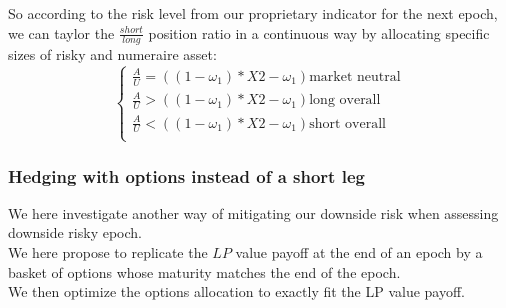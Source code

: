 \documentclass[conference]{IEEEtran}
\begin{document}
So according to the risk level from our proprietary indicator for the next epoch, we can taylor the $\frac{short}{long}$ position ratio in a continuous way by allocating specific sizes of risky and numeraire asset:\\
\begin{equation}
\left\{
\begin{array}{lll}
\frac{A}{U} = \left((1-\omega_1)*X2-\omega_1 \right)\text{market neutral} \\
\frac{A}{U} > \left((1-\omega_1)*X2-\omega_1 \right) \text{long overall} \\
\frac{A}{U} < \left((1-\omega_1)*X2-\omega_1 \right)\text{short overall}  \\
\end{array}
\end{equation}


\subsubsection{Hedging with options instead of a short leg}
We here investigate another way of mitigating our downside risk when assessing downside risky epoch.\\
We here propose to replicate the $LP$ value payoff at the end of an epoch by a basket of options whose maturity matches the end of the epoch.\\
We then optimize the options allocation to exactly fit the LP value payoff.\\
\end{document}
